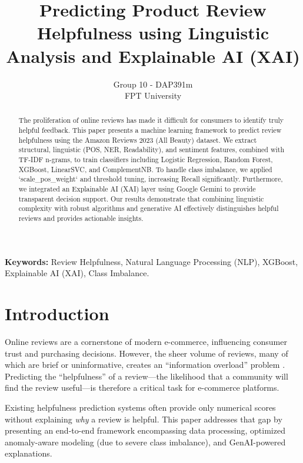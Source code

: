 \documentclass[11pt,a4paper,twoside]{article}
\title{\textbf{Predicting Product Review Helpfulness using Linguistic Analysis and Explainable AI (XAI)}}
\author{%
\begin{tabular}{c}
Group 10 - DAP391m\\[0.45em]
FPT University\\[0.25em]
\end{tabular}
}
\date{}
\begin{document}
\maketitle
\thispagestyle{empty}

\begin{abstract}
The proliferation of online reviews has made it difficult for consumers to identify truly helpful feedback. This paper presents a machine learning framework to predict review helpfulness using the Amazon Reviews 2023 (All Beauty) dataset. We extract structural, linguistic (POS, NER, Readability), and sentiment features, combined with TF-IDF n-grams, to train classifiers including Logistic Regression, Random Forest, XGBoost, LinearSVC, and ComplementNB. To handle class imbalance, we applied `scale_pos_weight` and threshold tuning, increasing Recall significantly. Furthermore, we integrated an Explainable AI (XAI) layer using Google Gemini to provide transparent decision support. Our results demonstrate that combining linguistic complexity with robust algorithms and generative AI effectively distinguishes helpful reviews and provides actionable insights.
\end{abstract}

\noindent\textbf{Keywords:} Review Helpfulness, Natural Language Processing (NLP), XGBoost, Explainable AI (XAI), Class Imbalance.

\section{Introduction}
Online reviews are a cornerstone of modern e-commerce, influencing consumer trust and purchasing decisions. However, the sheer volume of reviews, many of which are brief or uninformative, creates an ``information overload'' problem \cite{amazon2023}. Predicting the ``helpfulness'' of a review—the likelihood that a community will find the review useful—is therefore a critical task for e-commerce platforms.

Existing helpfulness prediction systems often provide only numerical scores without explaining \textit{why} a review is helpful. This paper addresses that gap by presenting an end-to-end framework encompassing data processing, optimized anomaly-aware modeling (due to severe class imbalance), and GenAI-powered explanations.

\end{document}
